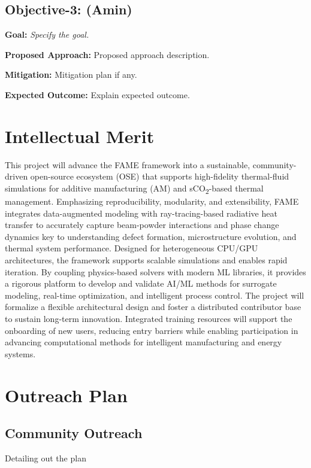 \documentclass[11pt]{article}
\newcommand{\CO}[1]{CO\textsubscript{#1}}
\begin{document}
\subsection{Objective-3: (Amin)}
\label{sec:object3}


\noindent
\textbf{\textcolor{FlyersRed}{{Goal:}}}
\textit{Specify the goal.}



\noindent
\textbf{\textcolor{FlyersRed}{{Proposed Approach:}}}
Proposed approach description.

\noindent
\textbf{\textcolor{FlyersRed}{{Mitigation:}}}
Mitigation plan if any.


\textbf{\textcolor{FlyersRed}{{Expected Outcome:}}}
Explain expected outcome. 


\section{Intellectual Merit}
This project will advance the FAME framework into a sustainable, community-driven open-source ecosystem (OSE) that supports high-fidelity thermal-fluid simulations for additive manufacturing (AM) and s\CO{2}-based thermal management. Emphasizing reproducibility, modularity, and extensibility, FAME integrates data-augmented modeling with ray-tracing-based radiative heat transfer to accurately capture beam-powder interactions and phase change dynamics key to understanding defect formation, microstructure evolution, and thermal system performance. Designed for heterogeneous CPU/GPU architectures, the framework supports scalable simulations and enables rapid iteration. By coupling physics-based solvers with modern ML libraries, it provides a rigorous platform to develop and validate AI/ML methods for surrogate modeling, real-time optimization, and intelligent process control. The project will formalize a flexible architectural design and foster a distributed contributor base to sustain long-term innovation. Integrated training resources will support the onboarding of new users, reducing entry barriers while enabling participation in advancing computational methods for intelligent manufacturing and energy systems.
 
\section{Outreach Plan}  
\subsection{Community Outreach} 
Detailing out the plan
\end{document}
